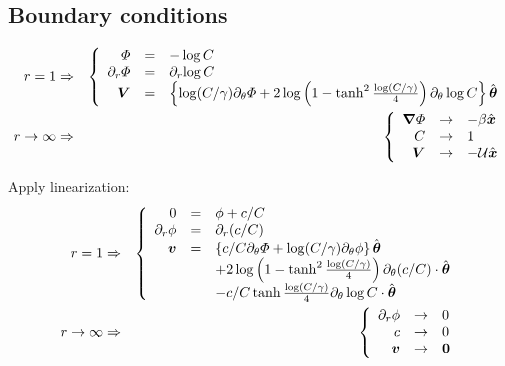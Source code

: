 \subsection{Boundary conditions}
\begin{eqnarray}
r = 1 &\Rightarrow&
\brc{rcl}{
  \varPhi & = & -\log C \\
  \partial_r {\varPhi} & = & \partial_r {\log C} \\
  \bV & = & \left\{\log (C/\gamma) \partial_\theta \varPhi +
  2 \log\left(1 - \tanh^2 \frac{\log (C/\gamma)}{4}\right)
  \partial_\theta \log C \right\} \bthetahat
}
\\
r \rightarrow \infty &\Rightarrow&
\brc{rcl}{
  \bnabla \varPhi &\rightarrow& -\beta \bxhat \\
  C &\rightarrow& 1 \\
  \bV &\rightarrow& -\mathcal{U} \bxhat
}
\end{eqnarray}

Apply linearization:
\begin{eqnarray}
r = 1 &\Rightarrow&
\brc{rcl}{
  0 & = & \phi + {c / C} \\
  \partial_r {\phi} & = &  \partial_r {(c/C)} \\
  \bv & = & \left\{c/C \partial_\theta \varPhi +
  \log (C/\gamma) \partial_\theta \phi \right\}\bthetahat
  \\ & &
  + 2 \log\left(1 - \tanh^2 \frac{\log (C/\gamma)}{4}\right)
  \partial_\theta (c/C) \cdot \bthetahat
  \\ & &
  - c/C \tanh \frac{\log (C/\gamma)}{4}
  \partial_\theta \log C \cdot \bthetahat
}
\\
r \rightarrow \infty &\Rightarrow&
\brc{rcl}{
  \partial_r \phi &\rightarrow& 0 \\
  c &\rightarrow& 0 \\
  \bv &\rightarrow& \bzero
}
\end{eqnarray}

